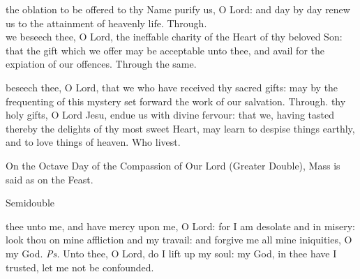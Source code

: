 
\secret
{} the oblation to be offered to thy Name purify us, O Lord: and day by day renew us to the attainment of heavenly life. Through.\\

 we beseech thee, O Lord, the ineffable charity of the Heart of thy beloved Son: that the gift which we offer may be acceptable unto thee, and avail for the expiation of our offences. Through the same.


\postcommunion
{} beseech thee, O Lord, that we who have received thy sacred gifts: may by the frequenting of this mystery set forward the work of our salvation. Through.
 thy holy gifts, O Lord Jesu, endue us with divine fervour: that we, having tasted thereby the delights of thy most sweet Heart, may learn to despise things earthly, and to love things of heaven. Who livest.
\begin{rubric}
    On the Octave Day of the Compassion of Our Lord (Greater Double), Mass is said as on the Feast.
\end{rubric}

\label{TrinityIII}
\begin{inhead}
    {Semidouble}
\end{inhead}
\par\noindent
{}



\introit
{} thee unto me, and have mercy upon me, O Lord: for I am desolate and in misery: look thou on mine affliction and my travail: and forgive me all mine iniquities, O my God. \textit{Ps.} Unto thee, O Lord, do I lift up my soul: my God, in thee have I trusted, let me not be confounded.

